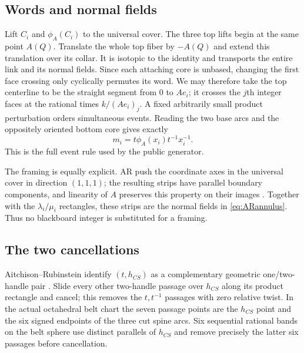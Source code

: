\subsection{Words and normal fields}

Lift $C_i$ and $\phi_A(C_i)$ to the universal cover.  The three top lifts
begin at the same point $A(Q)$.  Translate the whole top fiber by $-A(Q)$ and
extend this translation over its collar.  It is isotopic to the identity and
transports the entire link and its normal fields.  Since each attaching core
is unbased, changing the first face crossing only cyclically permutes its
word.  We may therefore take the top centerline to be the straight segment
from $0$ to $Ae_i$; it crosses the $j$th integer faces at
the rational times $k/(Ae_i)_j$.  A fixed arbitrarily small product
perturbation orders simultaneous events.  Reading the two base arcs and the
oppositely oriented bottom core gives exactly
\begin{equation}\label{eq:actualword}
m_i=t\phi_A(x_i)t^{-1}x_i^{-1}.
\end{equation}
This is the full event rule used by the public generator.

The framing is equally explicit.  AR push the coordinate axes in the
universal cover in direction $(1,1,1)$; the resulting strips have parallel
boundary components, and linearity of $A$ preserves this property on their
images \cite[pp.~16--17]{AitchisonRubinstein1984}.  Together with the
$\lambda_i/\mu_i$ rectangles, these strips are the normal fields in
\eqref{eq:ARannulus}.  Thus no blackboard integer is substituted for a
framing.

\subsection{The two cancellations}

Aitchison--Rubinstein identify $(t,h_{CS})$ as a complementary geometric
one/two-handle pair \cite[p.~7]{AitchisonRubinstein1984}.  Slide every other
two-handle passage over $h_{CS}$ along its product rectangle and cancel; this
removes the $t,t^{-1}$ passages with zero relative twist.
In the actual octahedral belt chart the seven passage points are the
$h_{CS}$ point and the six signed endpoints of the three cut spine arcs.
Six sequential rational bands on the belt sphere use distinct parallels of
$h_{CS}$ and remove precisely the latter six passages before cancellation.

